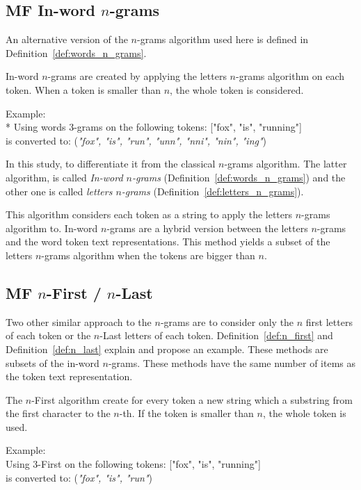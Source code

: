 \subsection{MF In-word $n$-grams}

An alternative version of the $n$-grams algorithm used here is defined in Definition~\ref{def:words_n_grams}.

\begin{definition}
  In-word $n$-grams are created by applying the letters $n$-grams algorithm on each token.
  When a token is smaller than $n$, the whole token is considered.

  Example: \\*
  Using words 3-grams on the following tokens: ["fox", "is", "running"] \\
  is converted to: (\textit{"fox", "is", "run", "unn", "nni", "nin", "ing"})
\end{definition}

In this study, to differentiate it from the classical $n$-grams algorithm.
The latter algorithm, is called \textit{In-word $n$-grams} (Definition~\ref{def:words_n_grams}) and the other one is called \textit{letters $n$-grams} (Definition~\ref{def:letters_n_grams}).

This algorithm considers each token as a string to apply the letters $n$-grams algorithm to.
In-word $n$-grams are a hybrid version between the letters $n$-grams and the word token text representations.
This method yields a subset of the letters $n$-grams algorithm when the tokens are bigger than $n$.

\subsection{MF $n$-First / $n$-Last}

Two other similar approach to the $n$-grams are to consider only the $n$ first letters of each token or the $n$-Last letters of each token.
Definition~\ref{def:n_first} and Definition~\ref{def:n_last} explain and propose an example.
These methods are subsets of the in-word $n$-grams.
These methods have the same number of items as the token text representation.

\begin{definition}
  The $n$-First algorithm create for every token a new string which a substring from the first character to the $n$-th.
  If the token is smaller than $n$, the whole token is used.

  Example: \\
  Using $3$-First on the following tokens: ["fox", "is", "running"] \\
  is converted to: (\textit{"fox", "is", "run"})
\end{definition}


